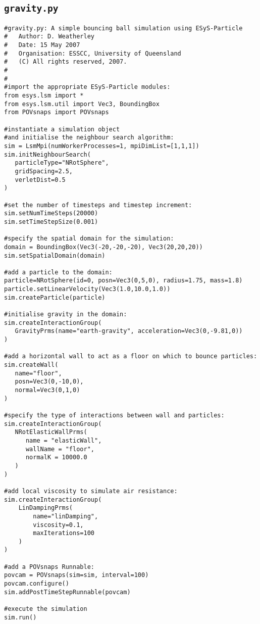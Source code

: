 \subsection{\texttt{gravity.py}}\label{code:gravity}

\begin{verbatim}
#gravity.py: A simple bouncing ball simulation using ESyS-Particle
#	Author: D. Weatherley
#	Date: 15 May 2007
#	Organisation: ESSCC, University of Queensland
#	(C) All rights reserved, 2007.
#
#
#import the appropriate ESyS-Particle modules:
from esys.lsm import *
from esys.lsm.util import Vec3, BoundingBox
from POVsnaps import POVsnaps

#instantiate a simulation object 
#and initialise the neighbour search algorithm:
sim = LsmMpi(numWorkerProcesses=1, mpiDimList=[1,1,1])
sim.initNeighbourSearch(
   particleType="NRotSphere",
   gridSpacing=2.5,
   verletDist=0.5
)

#set the number of timesteps and timestep increment:
sim.setNumTimeSteps(20000)
sim.setTimeStepSize(0.001)

#specify the spatial domain for the simulation:
domain = BoundingBox(Vec3(-20,-20,-20), Vec3(20,20,20))
sim.setSpatialDomain(domain)

#add a particle to the domain:
particle=NRotSphere(id=0, posn=Vec3(0,5,0), radius=1.75, mass=1.8)
particle.setLinearVelocity(Vec3(1.0,10.0,1.0))
sim.createParticle(particle)

#initialise gravity in the domain:
sim.createInteractionGroup(
   GravityPrms(name="earth-gravity", acceleration=Vec3(0,-9.81,0))
)

#add a horizontal wall to act as a floor on which to bounce particles:
sim.createWall(
   name="floor",
   posn=Vec3(0,-10,0),
   normal=Vec3(0,1,0)
)

#specify the type of interactions between wall and particles:
sim.createInteractionGroup(
   NRotElasticWallPrms(
      name = "elasticWall",
      wallName = "floor",
      normalK = 10000.0
   )
)

#add local viscosity to simulate air resistance:
sim.createInteractionGroup(
    LinDampingPrms(
        name="linDamping",
        viscosity=0.1,
        maxIterations=100
    )
)

#add a POVsnaps Runnable:
povcam = POVsnaps(sim=sim, interval=100)
povcam.configure()
sim.addPostTimeStepRunnable(povcam)

#execute the simulation
sim.run()
\end{verbatim}

